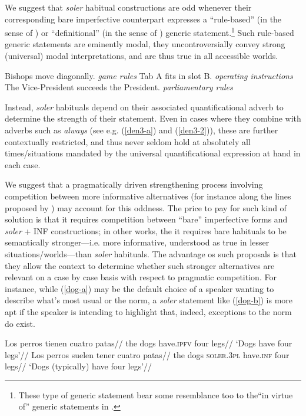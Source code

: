 \documentclass{cascadilla-xelatex-biblatex}
\begin{document}
	We suggest that \textit{soler} habitual constructions are odd whenever their corresponding bare imperfective counterpart expresses a  ``rule-based'' (in the sense of \cite{Carlson:1995}) or ``definitional'' (in the sense of \cite{Krifka:2013}) generic statement.\footnote{These type of generic statement bear some resemblance too to the``in virtue of'' generic statements in \textcite{Greenberg:2003}.} Such rule-based generic statements are eminently modal, they uncontroversially convey strong (universal) modal interpretations, and are thus true in all accessible worlds.
	
	\pex 
	\a Bishops move diagonally. \hfill \textit{game rules}
	\a Tab A fits in slot B. \hfill \textit{operating instructions}
	\a The Vice-President succeeds the President. \hfill \textit{parliamentary rules}
	\xe
	
	Instead, \textit{soler} habituals depend on their associated quantificational adverb to determine the strength of their statement. Even in cases where they combine with adverbs such as \textit{always} (see e.g. (\ref{den3-a}) and (\ref{den3-2})), these are further contextually restricted, and thus never seldom hold at absolutely all times/situations mandated by the universal quantificational expression at hand in each case.
	
	
	We suggest that a pragmatically driven strengthening process involving competition between more informative alternatives (for instance along the lines proposed by \cite{Magri:2009}) may account for this oddness. The price to pay for such kind of solution is that it requires competition between ``bare'' imperfective forms and \textit{soler} + INF constructions; in other works, the it requires bare habituals to be semantically stronger---i.e. more informative, understood as true in lesser situations/worlds---than \textit{soler} habituals. The advantage os such proposals is that they allow the context to determine whether such stronger alternatives are relevant on a case by case basis with respect to pragmatic competition. For instance, while (\ref{dog-a}) may be the default choice of a speaker wanting to describe what's most usual or the norm, a \textit{soler} statement like (\ref{dog-b}) is more apt if the speaker is intending to highlight that, indeed, exceptions to the norm do exist.
	
	
	\pex\label{dog}
	\a\label{dog-a}\begingl
	\gla Los perros tienen cuatro patas//
	\glb the dogs have.\textsc{ipfv} four legs//
	\glft `Dogs have four legs'//
	\endgl
	\a\label{dog-b}\begingl
	\gla Los perros suelen tener cuatro patas//
	\glb the dogs \textsc{soler.3pl} have.\textsc{inf} four legs//
	\glft `Dogs (typically) have four legs'//
	\endgl
	\xe
	
\end{document}
